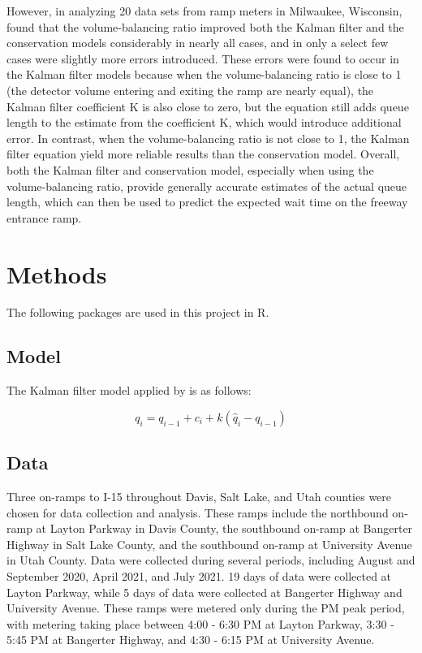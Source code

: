 \documentclass[numbered]{trbarticle}
\begin{document}
However, in analyzing 20 data sets from ramp meters in Milwaukee, Wisconsin, \citet{wu2009experiment} found that the volume-balancing ratio improved both the Kalman filter and the conservation models considerably in nearly all cases, and in only a select few cases were slightly more errors introduced. These errors were found to occur in the Kalman filter models because when the volume-balancing ratio is close to 1 (the detector volume entering and exiting the ramp are nearly equal), the Kalman filter coefficient K is also close to zero, but the equation still adds queue length to the estimate from the coefficient K, which would introduce additional error. In contrast, when the volume-balancing ratio is not close to 1, the Kalman filter equation yield more reliable results than the conservation model. Overall, both the Kalman filter and conservation model, especially when using the volume-balancing ratio, provide generally accurate estimates of the actual queue length, which can then be used to predict the expected wait time on the freeway entrance ramp.

\hypertarget{methods}{%
\section{Methods}\label{methods}}

The following packages are used in this project in R.

\hypertarget{model}{%
\subsection{Model}\label{model}}

The Kalman filter model applied by \citet{horowitz} is as follows:

\begin{equation}
q_i = q_{i-1} + c_i + k (\hat{q}_i - q_{i-1})
  \label{eq:kalman}
\end{equation}

\hypertarget{data}{%
\subsection{Data}\label{data}}

Three on-ramps to I-15 throughout Davis, Salt Lake, and Utah counties were chosen for data collection and analysis. These ramps include the northbound on-ramp at Layton Parkway in Davis County, the southbound on-ramp at Bangerter Highway in Salt Lake County, and the southbound on-ramp at University Avenue in Utah County. Data were collected during several periods, including August and September 2020, April 2021, and July 2021. 19 days of data were collected at Layton Parkway, while 5 days of data were collected at Bangerter Highway and University Avenue. These ramps were metered only during the PM peak period, with metering taking place between 4:00 - 6:30 PM at Layton Parkway, 3:30 - 5:45 PM at Bangerter Highway, and 4:30 - 6:15 PM at University Avenue.
\end{document}
